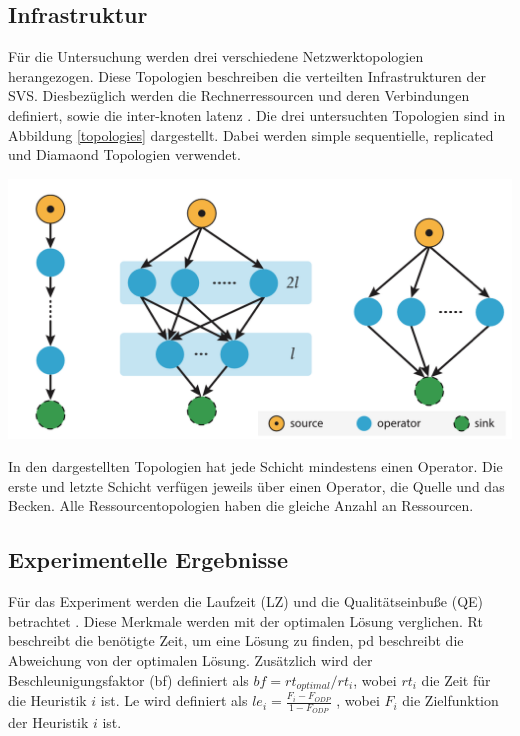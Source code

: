\documentclass{article}
\begin{document}
\subsection{Infrastruktur}
Für die Untersuchung werden drei verschiedene Netzwerktopologien herangezogen. 
Diese Topologien beschreiben die verteilten Infrastrukturen der SVS. 
Diesbezüglich werden die Rechnerressourcen und deren Verbindungen definiert, sowie die inter-knoten latenz \cite{efficient-operator-placement}.
Die drei untersuchten Topologien sind in Abbildung \ref{topologies} dargestellt. Dabei werden simple sequentielle, replicated und Diamaond Topologien verwendet.\\

\noindent
\begin{minipage}{0.45\textwidth}
    \includegraphics[width=0.75\linewidth]{topologies.png}
\label{topologies}
\end{minipage}
\hspace{10pt}
\begin{minipage}{0.5\textwidth}
    In den dargestellten Topologien hat jede Schicht mindestens einen Operator. 
    Die erste und letzte Schicht verfügen jeweils über einen Operator, die Quelle und das Becken. 
    Alle Ressourcentopologien haben die gleiche Anzahl an Ressourcen.
\end{minipage}



\subsection{Experimentelle Ergebnisse}

Für das Experiment werden die Laufzeit (LZ) und die Qualitätseinbuße (QE) betrachtet \cite{efficient-operator-placement}.
Diese Merkmale werden mit der optimalen Lösung verglichen. Rt beschreibt die benötigte Zeit, 
um eine Lösung zu finden, pd beschreibt die Abweichung von der optimalen Lösung. 
Zusätzlich wird der Beschleunigungsfaktor (bf) definiert als $bf = rt_{optimal} / rt_i$, wobei $rt_i$ die Zeit für die Heuristik $i$ ist.
Le wird definiert als $le_i = \frac{F_i - F_{ODP}}{1 - F_{ODP}}$ \cite{efficient-operator-placement}, 
wobei $F_i$ die Zielfunktion der Heuristik $i$ ist.
\end{document}
